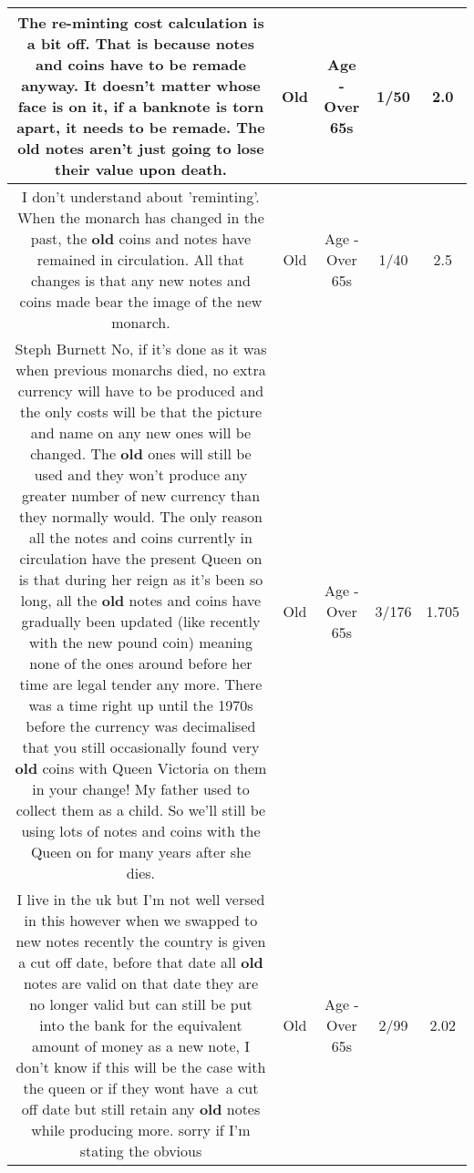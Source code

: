 \documentclass[11pt]{article}
\newlength\mylength
\begin{document}
\begin{center}
\begin{longtable}{|C{.65\mylength}|C{.30\mylength}|C{.12\mylength}|C{.12\mylength}|C{.12\mylength}|}
  \small The re-minting cost calculation is a bit off. That is because notes and coins have to be remade anyway. It doesn't matter whose face is on it, if a banknote is torn apart, it needs to be remade. The \textbf{old} notes aren't just going to lose their value upon death.\normalsize   & Old & Age - Over 65s & 1/50 & 2.0 \\  \hline
  \small I don't understand about 'reminting'. When the monarch has changed in the past, the \textbf{old} coins and notes have remained in circulation. All that changes is that any new notes and coins made bear the image of the new monarch.\normalsize   & Old & Age - Over 65s & 1/40 & 2.5 \\  \hline
  \small Steph Burnett No, if it's done as it was when previous monarchs died, no extra currency will have to be produced and the only costs will be that the picture and name on any new ones will be changed. The \textbf{old} ones will still be used and they won't produce any greater number of new currency than they normally would. The only reason all the notes and coins currently in circulation have the present Queen on is that during her reign as it's been so long, all the \textbf{old} notes and coins have gradually been updated (like recently with the new pound coin) meaning none of the ones around before her time are legal tender any more. There was a time right up until the 1970s before the currency was decimalised that you still occasionally found very \textbf{old} coins with Queen Victoria on them in your change! My father used to collect them as a child. So we'll still be using lots of notes and coins with the Queen on for many years after she dies.\normalsize   & Old & Age - Over 65s & 3/176 & 1.705 \\  \hline
  \small I live in the uk but I'm not well versed in this however when we swapped to new notes recently the country is given a cut off date, before that date all \textbf{old} notes are valid on that date they are no longer valid but can still be put into the bank for the equivalent amount of money as a new note, I don't know if this will be the case with the queen or if they wont have a cut off date but still retain any \textbf{old} notes while producing more. sorry if I'm stating the obvious   \normalsize   & Old & Age - Over 65s & 2/99 & 2.02 \\  \hline

\end{longtable}
\end{center}
\end{document}
